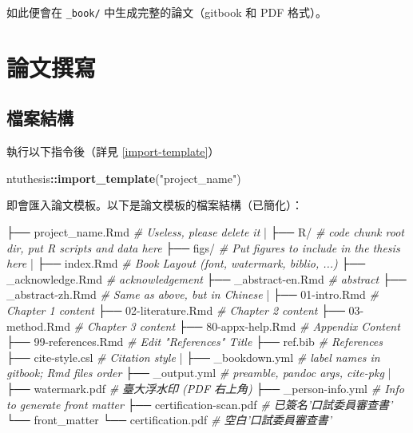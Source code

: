 \documentclass[oneside]{book}
\newenvironment{Shaded}{\begin{snugshade}}{\end{snugshade}}
\newcommand{\CommentTok}[1]{\textcolor[rgb]{0.56,0.35,0.01}{\textit{#1}}}
\newcommand{\KeywordTok}[1]{\textcolor[rgb]{0.13,0.29,0.53}{\textbf{#1}}}
\newcommand{\NormalTok}[1]{#1}
\newcommand{\OperatorTok}[1]{\textcolor[rgb]{0.81,0.36,0.00}{\textbf{#1}}}
\newcommand{\StringTok}[1]{\textcolor[rgb]{0.31,0.60,0.02}{#1}}
\theoremstyle{definition}
\theoremstyle{definition}
\theoremstyle{definition}
\theoremstyle{remark}
\begin{document}
如此便會在 \texttt{\_book/} 中生成完整的論文（gitbook 和 PDF 格式）。

\hypertarget{write-thesis}{%
\chapter{論文撰寫}\label{write-thesis}}

\hypertarget{dir-structure}{%
\section{檔案結構}\label{dir-structure}}

執行以下指令後（詳見 \ref{import-template}）

\begin{Shaded}
\begin{Highlighting}[]
\NormalTok{ntuthesis}\OperatorTok{::}\KeywordTok{import_template}\NormalTok{(}\StringTok{"project_name"}\NormalTok{)}
\end{Highlighting}
\end{Shaded}

即會匯入論文模板。以下是論文模板的檔案結構（已簡化）：

\begin{Shaded}
\begin{Highlighting}[]
\NormalTok{├── project_name.Rmd     }\CommentTok{# Useless, please delete it}
\NormalTok{|}
\NormalTok{├── R/                   }\CommentTok{# code chunk root dir, put R scripts and data here}
\NormalTok{├── figs/                }\CommentTok{# Put figures to include in the thesis here}
\NormalTok{|}
\NormalTok{├── index.Rmd            }\CommentTok{# Book Layout (font, watermark, biblio, ...)}
\NormalTok{├── _acknowledge.Rmd     }\CommentTok{# acknowledgement}
\NormalTok{├── _abstract-en.Rmd     }\CommentTok{# abstract}
\NormalTok{├── _abstract-zh.Rmd     }\CommentTok{# Same as above, but in Chinese}
\NormalTok{|}
\NormalTok{├── 01-intro.Rmd         }\CommentTok{# Chapter 1 content}
\NormalTok{├── 02-literature.Rmd    }\CommentTok{# Chapter 2 content}
\NormalTok{├── 03-method.Rmd        }\CommentTok{# Chapter 3 content}
\NormalTok{├── 80-appx-help.Rmd     }\CommentTok{# Appendix Content}
\NormalTok{├── 99-references.Rmd    }\CommentTok{# Edit "References" Title}
\NormalTok{├── ref.bib              }\CommentTok{# References}
\NormalTok{├── cite-style.csl       }\CommentTok{# Citation style}
\NormalTok{|}
\NormalTok{├── _bookdown.yml        }\CommentTok{# label names in gitbook; Rmd files order}
\NormalTok{├── _output.yml          }\CommentTok{# preamble, pandoc args, cite-pkg}
\NormalTok{|}
\NormalTok{├── watermark.pdf        }\CommentTok{# 臺大浮水印 (PDF 右上角)}
\NormalTok{├── _person-info.yml      }\CommentTok{# Info to generate front matter}
\NormalTok{├── certification-scan.pdf  }\CommentTok{# 已簽名'口試委員審查書'}
\NormalTok{└── front_matter}
\NormalTok{    └── certification.pdf   }\CommentTok{# 空白'口試委員審查書'}
\end{Highlighting}
\end{Shaded}
\end{document}
